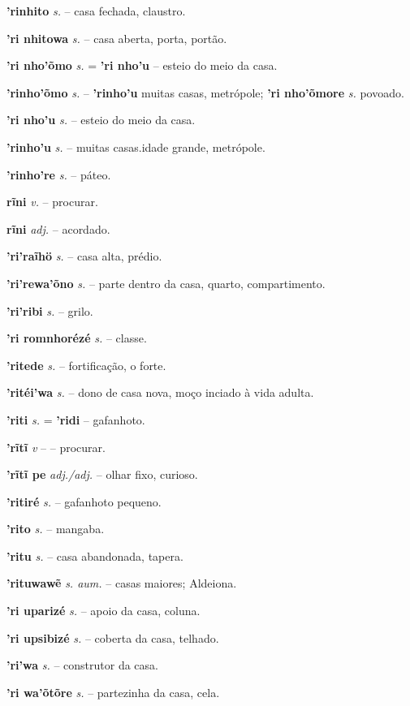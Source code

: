 \textbf{'rinhito} \textit{s.} -- casa fechada, claustro.

\textbf{'ri nhitowa} \textit{s.} -- casa aberta, porta, portão.

\textbf{'ri nho'õmo} \textit{s.} = \textbf{'ri nho'u} -- esteio do meio da casa.

\textbf{'rinho'õmo} \textit{s.} -- \textbf{'rinho'u} muitas casas, metrópole; \textbf{'ri nho'õmore} \textit{s.} povoado.

\textbf{'ri nho'u} \textit{s.} -- esteio do meio da casa.

\textbf{'rinho'u} \textit{s.} -- muitas casas.idade grande, metrópole.

\textbf{'rinho're} \textit{s.} -- páteo.

\textbf{rĩni} \textit{v.} -- procurar.

\textbf{rĩni} \textit{adj.} -- acordado.

\textbf{'ri'raĩhö} \textit{s.} -- casa alta, prédio.

\textbf{'ri'rewa'õno} \textit{s.} -- parte dentro da casa, quarto, compartimento.

\textbf{'ri'ribi} \textit{s.} -- grilo.

\textbf{'ri romnhorézé} \textit{s.} -- classe.

\textbf{'ritede} \textit{s.} -- fortificação, o forte.

\textbf{'ritéi'wa} \textit{s.} -- dono de casa nova, moço inciado à vida adulta.

\textbf{'riti} \textit{s.} = \textbf{'ridi} -- gafanhoto.

\textbf{'rĩtĩ} \textit{v} -- -- procurar.

\textbf{'rĩtĩ pe} \textit{adj./adj.} -- olhar fixo, curioso.

\textbf{'ritiré} \textit{s.} -- gafanhoto pequeno.

\textbf{'rito} \textit{s.} -- mangaba.

\textbf{'ritu} \textit{s.} -- casa abandonada, tapera.

\textbf{'rituwawẽ} \textit{s. aum.} -- casas maiores; Aldeiona.

\textbf{'ri uparizé} \textit{s.} -- apoio da casa, coluna.

\textbf{'ri upsibizé} \textit{s.} -- coberta da casa, telhado.

\textbf{'ri'wa} \textit{s.} -- construtor da casa.

\textbf{'ri wa'õtõre} \textit{s.} -- partezinha da casa, cela.


